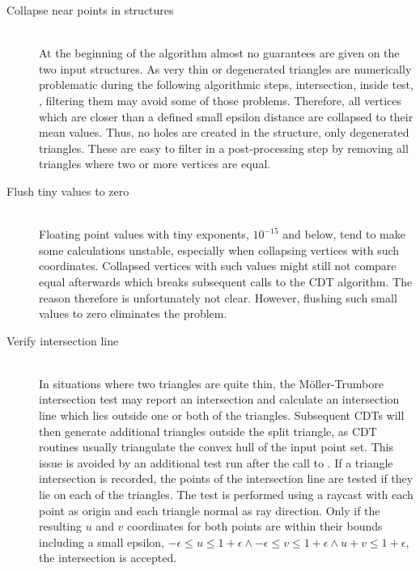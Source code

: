 \begin{description}

	\item[Collapse near points in structures] \hfill \\
	At the beginning of the  algorithm almost no guarantees are given on the two input structures.
	As very thin or degenerated triangles are numerically problematic during the following algorithmic steps, \eg intersection, inside test, \etc, filtering them may avoid some of those problems.
	Therefore, all vertices which are closer than a defined small epsilon distance are collapsed to their mean values.
	Thus, no holes are created in the structure, only degenerated triangles.
	These are easy to filter in a post-processing step by removing all triangles where two or more vertices are equal.


	\item[Flush tiny values to zero] \hfill \\
	Floating point values with tiny exponents, \eg $10^{-15}$ and below, tend to make some calculations unstable, especially when collapsing vertices with such coordinates.
	Collapsed vertices with such values might still not compare equal afterwards which breaks subsequent calls to the CDT algorithm.
	The reason therefore is unfortunately not clear.
	However, flushing such small values to zero eliminates the problem.


	\item[Verify intersection line] \hfill \\
	In situations where two triangles are quite thin, the Möller-Trumbore intersection test may report an intersection and calculate an intersection line which lies outside one or both of the triangles.
	Subsequent CDTs will then generate additional triangles outside the split triangle, as CDT routines usually triangulate the convex hull of the input point set.
	This issue is avoided by an additional test run after the call to .
	If a triangle intersection is recorded, the points of the intersection line are tested if they lie on each of the triangles.
	The test is performed using a raycast with each point as origin and each triangle normal as ray direction.
	Only if the resulting $u$ and $v$ coordinates for both points are within their bounds including a small epsilon, \ie $-\epsilon \leq u \leq 1+\epsilon \wedge -\epsilon \leq v \leq 1+\epsilon \wedge u + v \leq 1 + \epsilon$, the intersection is accepted.



\end{description}
